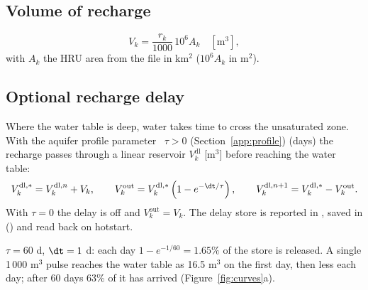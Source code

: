 \subsection{Volume of recharge}
\begin{equation}
V_k=\frac{r_k}{1000}\,10^{6}A_k \quad[\mathrm{m}^3],
\end{equation}
with $A_k$ the HRU area from the  file in km$^2$ ($10^6A_k$ in m$^2$).

\subsection{Optional recharge delay}
Where the water table is deep, water takes time to cross the unsaturated zone. With the aquifer profile parameter ~$\tau>0$ (Section~\ref{app:profile})
(days) the recharge passes through a linear reservoir $V^{\mathrm{dl}}_k$ [m$^3$] before reaching the water table:
\begin{equation}
V^{\mathrm{dl},*}_k=V^{\mathrm{dl},n}_k+V_k,\qquad V_k^{\mathrm{out}}=V^{\mathrm{dl},*}_k\left(1-e^{-\dt/\tau}\right),\qquad V^{\mathrm{dl},n+1}_k=V^{\mathrm{dl},*}_k-V_k^{\mathrm{out}} .
\end{equation}
With $\tau=0$ the delay is off and $V_k^{\mathrm{out}}=V_k$. The delay store is reported in , saved in
 () and read back on hotstart.
\begin{example}
$\tau=60$ d, $\dt=1$ d: each day $1-e^{-1/60}=1.65\%$ of the store is released. A single 1\,000 m$^3$ pulse reaches the
water table as 16.5 m$^3$ on the first day, then less each day; after 60 days 63\% of it has arrived
(Figure~\ref{fig:curves}a).
\end{example}

